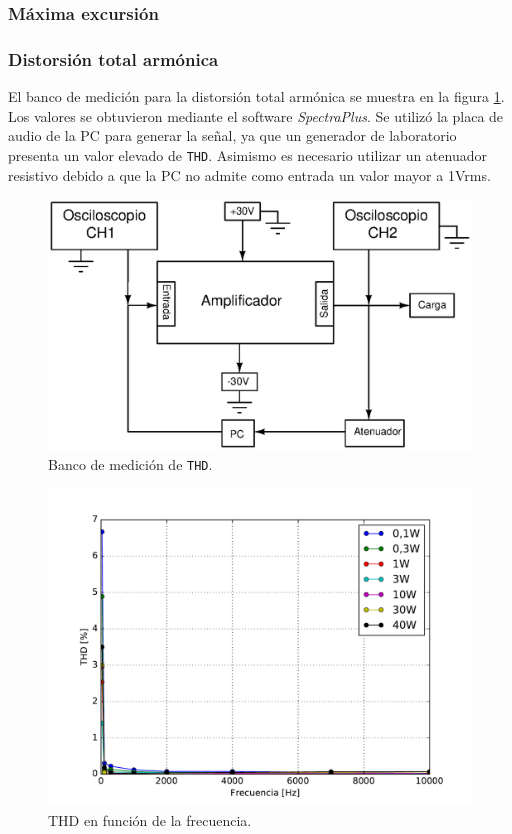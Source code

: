 		\subsubsection{Máxima excursión}

		\subsubsection{Distorsión total armónica}

		El banco de medición para la distorsión total armónica se muestra en la figura \ref{fig:thd_bco}. Los valores se obtuvieron mediante el software \textit{SpectraPlus}. Se utilizó la placa de audio de la PC para generar la señal, ya que un generador de laboratorio presenta un valor elevado de \texttt{THD}. Asimismo es necesario utilizar un atenuador resistivo debido a que la PC no admite como entrada un valor mayor a 1Vrms. 

		\begin{figure}[h!]
			\centering
			\includegraphics[scale=0.6]{./Figuras/banco_thd.eps}
			\caption{Banco de medición de \texttt{THD}.}
			\label{fig:thd_bco}
		\end{figure}

		\begin{figure}[H]
			\centering
			\includegraphics[scale=0.6]{./Figuras/thd.pdf}
			\caption{THD en función de la frecuencia.}
			\label{fig:thd}
		\end{figure}

